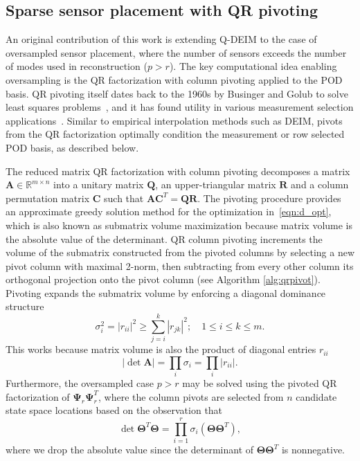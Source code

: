 \documentclass[letterpaper]{IEEEtran}
\newcommand{\bA}{\mathbf{A}}
\newcommand{\bC}{\mathbf{C}}
\newcommand{\bR}{\mathbf{R}}
\newcommand{\bQ}{\mathbf{Q}}
\newcommand{\bPsi}{\mathbf{\Psi}}
\newcommand{\bTheta}{\mathbf{\Theta}}
\newcommand{\reals}{\mathbb{R}}
\begin{document}
\subsection{Sparse sensor placement with QR pivoting}\label{Sec:QR}

An original contribution of this work is extending Q-DEIM to the case of oversampled sensor placement, where the number of sensors exceeds the number of modes used in reconstruction ($p>r$). The key computational idea enabling oversampling is the QR factorization with column pivoting applied to the POD basis. QR pivoting itself dates back to the 1960s by Businger and Golub to solve least squares problems~\cite{Businger1965nm}, and it has found utility in various measurement selection applications~\cite{Sommariva2009qr,Heck1998qr,Seshadri2016qr}. Similar to empirical interpolation methods such as DEIM, pivots from the QR factorization optimally condition the measurement or row selected POD basis, as described below.  

	The reduced matrix QR factorization with column pivoting decomposes a matrix $\bA\in\reals^{m\times n}$ into a unitary matrix $\bQ$, an upper-triangular matrix $\bR$ and a column permutation matrix $\bC$ such that $\bA\bC^T = \bQ\bR$. The pivoting procedure provides an approximate greedy solution method for the optimization in~\eqref{eqn:d_opt}, which is also known as submatrix volume maximization because matrix volume is the absolute value of the determinant. QR column pivoting increments the volume of the submatrix constructed from the pivoted columns by selecting a new pivot column with maximal 2-norm, then subtracting from every other column its orthogonal projection onto the pivot column (see Algorithm \ref{alg:qrpivot}). Pivoting expands the submatrix volume by enforcing a diagonal dominance structure~\cite{drmac2016siam}
	\begin{equation}
		\sigma_i^2 = |r_{ii}|^2 \ge \sum_{j=i}^k |r_{jk}|^2; \quad 1\le i \le k \le m.
	\end{equation}
	This works because matrix volume is also the product of diagonal entries $r_{ii}$
	\begin{equation}
		\left| \det \bA \right| = \prod_i \sigma_i = \prod_i |r_{ii}|.
	\end{equation}
	Furthermore, the oversampled case $p>r$ may be solved using the pivoted QR factorization of $\bPsi_r\bPsi_r^T$, where the column pivots are selected from $n$ candidate state space locations based on the observation that
	\begin{equation}
		\det \bTheta^T\bTheta  = \prod_{i=1}^r \sigma_i(\bTheta\bTheta^T),
	\end{equation}
	where we drop the absolute value since the determinant of $\bTheta\bTheta^T$ is nonnegative.
\end{document}
